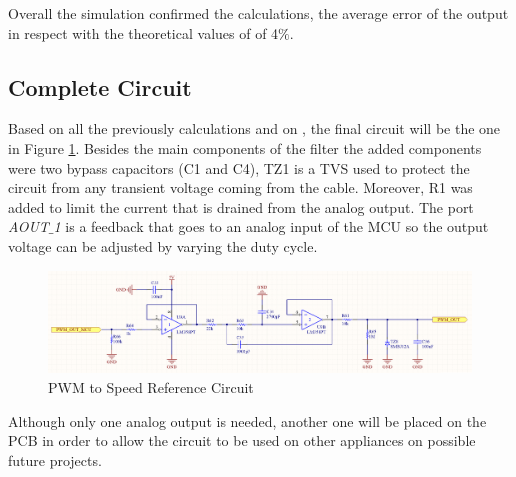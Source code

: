 		Overall the simulation confirmed the calculations, the average error of the output in respect with the theoretical values of of 4$\%$.

	\subsection{Complete Circuit}\label{ssec:pwm-to-speed-reference-circuit}
	
		Based on all the previously calculations and on \cite{texas1999sallenkey}, the final circuit will be the one in Figure \ref{fig:pwmToSpeedReferenceCircuit}. Besides the main components of the filter the added components were two bypass capacitors (C1 and C4), TZ1 is a TVS used to protect the circuit from any transient voltage coming from the cable. Moreover, R1 was added to limit the current that is drained from the analog output. The port \textit{AOUT$\_$1} is a feedback that goes to an analog input of the MCU so the output voltage can be adjusted by varying the duty cycle.

	
		\begin{figure}[htbp]
			\centering
			\includegraphics[width=1\textwidth]{figuras/fig-pwmToSpeedReferenceCircuit}
			\caption{PWM to Speed Reference Circuit}
			\label{fig:pwmToSpeedReferenceCircuit}
		\end{figure}

		Although only one analog output is needed, another one will be placed on the PCB in order to allow the circuit to be used on other appliances on possible future projects.